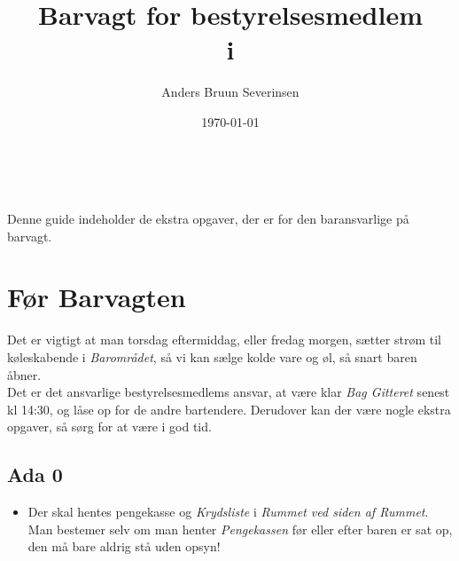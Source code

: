 

\title{Barvagt for bestyrelsesmedlem\\ i \fredagscafeen}
\date{\today}
\author{Anders Bruun Severinsen}



\maketitle

\tableofcontents \

Denne guide indeholder de ekstra opgaver, 
der er for den baransvarlige på barvagt.

\section{Før Barvagten}
\label{sec:pre-barvagten}
Det er vigtigt at man torsdag eftermiddag, eller fredag morgen, sætter strøm til køleskabende i 
\textit{Barområdet}, så vi kan sælge kolde vare og øl, så snart baren åbner.\\

Det er det ansvarlige bestyrelsesmedlems ansvar, at være klar \textit{Bag Gitteret} senest kl 14:30, 
og låse op for de andre bartendere.
Derudover kan der være nogle ekstra opgaver, så sørg for at være i god tid. 

\subsection{Ada 0}
\label{sec:pre:ada}

\begin{itemize}
    \item Der skal hentes pengekasse og \textit{Krydsliste} i \textit{Rummet ved siden af 
    Rummet}. Man bestemer selv om man henter 
    \textit{Pengekassen} før eller efter baren er sat op, den må bare aldrig stå uden opsyn!
\end{itemize}

